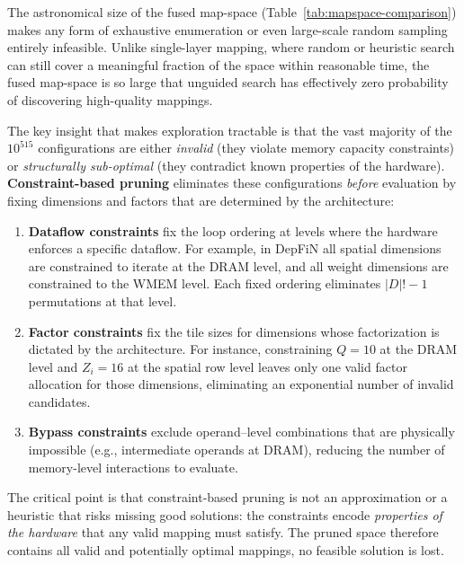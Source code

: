 The astronomical size of the fused map-space
(Table~\ref{tab:mapspace-comparison}) makes any form of exhaustive
enumeration or even large-scale random sampling entirely infeasible.
Unlike single-layer mapping, where random or heuristic search can
still cover a meaningful fraction of the space within reasonable
time, the fused map-space is so large that unguided search has
effectively zero probability of discovering high-quality mappings.

The key insight that makes exploration tractable is that the vast
majority of the $10^{515}$ configurations are either \emph{invalid}
(they violate memory capacity constraints) or \emph{structurally
sub-optimal} (they contradict known properties of the hardware).
\textbf{Constraint-based pruning} eliminates these configurations
\emph{before} evaluation by fixing dimensions and factors that are
determined by the architecture:

\begin{enumerate}
  \item \textbf{Dataflow constraints} fix the loop ordering at levels
        where the hardware enforces a specific dataflow.
        For example, in DepFiN all spatial dimensions are constrained
        to iterate at the DRAM level, and all weight dimensions are
        constrained to the WMEM level.
        Each fixed ordering eliminates $|D|! - 1$ permutations at that
        level.

  \item \textbf{Factor constraints} fix the tile sizes for dimensions
        whose factorization is dictated by the architecture.
        For instance, constraining $Q = 10$ at the DRAM level and
        $Z_i = 16$ at the spatial row level leaves only one valid
        factor allocation for those dimensions, eliminating an
        exponential number of invalid candidates.

  \item \textbf{Bypass constraints} exclude operand--level
        combinations that are physically impossible (e.g.,
        intermediate operands at DRAM), reducing the number of
        memory-level interactions to evaluate.
\end{enumerate}

The critical point is that constraint-based pruning is not an
approximation or a heuristic that risks missing good solutions: the
constraints encode \emph{properties of the hardware} that any valid
mapping must satisfy.
The pruned space therefore contains all valid and potentially
optimal mappings, no feasible solution is lost.
